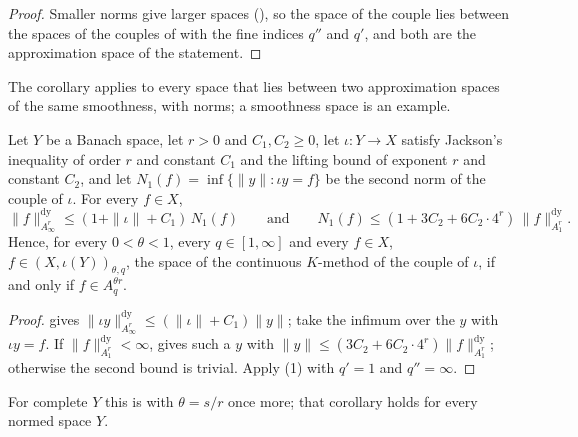 \begin{proof}
\leanok
Smaller norms give larger spaces (), so the space of the couple
lies between the spaces of the couples of  with the
fine indices $q''$ and $q'$, and both are the approximation space of the statement.
\end{proof}

The corollary applies to every space that lies between two approximation spaces of the same
smoothness, with norms; a smoothness space is an example.

\begin{corollary}
\label{cor:representation-sandwich}
\leanok
{}
Let $Y$ be a Banach space, let $r > 0$ and $C_1, C_2 \geq 0$, let $\iota : Y \to X$ satisfy
Jackson's inequality of order $r$ and constant $C_1$ and the lifting bound of exponent $r$ and
constant $C_2$, and let $N_1(f) = \inf \{\|y\| : \iota y = f\}$ be the second norm of the
couple of $\iota$. For every $f \in X$,
\[
  \|f\|^{\mathrm{dy}}_{A^r_\infty} \leq (1 + \|\iota\| + C_1) \, N_1(f)
  \qquad \text{and} \qquad
  N_1(f) \leq (1 + 3 C_2 + 6 C_2 \cdot 4^r) \, \|f\|^{\mathrm{dy}}_{A^r_1} .
\]
Hence, for every $0 < \theta < 1$, every $q \in [1, \infty]$ and every $f \in X$,
$f \in (X, \iota(Y))_{\theta, q}$, the space of the continuous $K$-method of the couple of
$\iota$, if and only if $f \in A^{\theta r}_q$.
\end{corollary}

\begin{proof}
\leanok
{} gives $\|\iota y\|^{\mathrm{dy}}_{A^r_\infty} \leq (\|\iota\| + C_1)
\|y\|$; take the infimum over the $y$ with $\iota y = f$. If
$\|f\|^{\mathrm{dy}}_{A^r_1} < \infty$,  gives such a $y$ with
$\|y\| \leq (3 C_2 + 6 C_2 \cdot 4^r) \|f\|^{\mathrm{dy}}_{A^r_1}$; otherwise the second bound
is trivial. Apply  (1) with $q' = 1$ and
$q'' = \infty$.
\end{proof}

For complete $Y$ this is  with $\theta = s/r$
once more; that corollary holds for every normed space $Y$.

